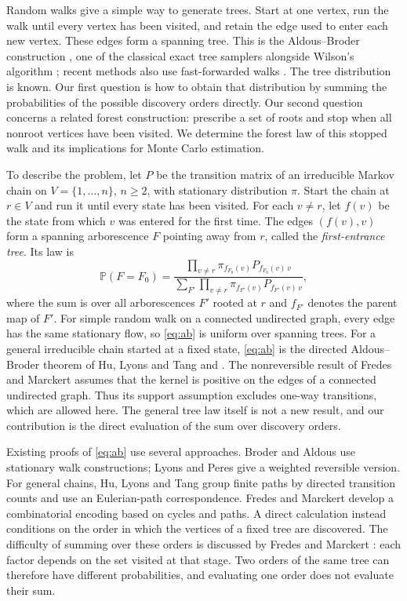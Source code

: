 \documentclass[onefignum,onetabnum,nohypdvips]{siamart250211}
\numberwithin{theorem}{section}
\numberwithin{equation}{section}
\newcommand{\pr}{\mathbb{P}}
\begin{document}
Random walks give a simple way to generate trees. Start at one vertex,
run the walk until every vertex has been visited, and retain the edge
used to enter each new vertex. These edges form a spanning tree. This
is the Aldous--Broder construction \cite{Broder1989,Aldous1990}, one of
the classical exact tree samplers alongside Wilson's algorithm
\cite{Wilson1996,ProppWilson1998}; recent methods also use
fast-forwarded walks \cite{TamDunsonDuan2025}. The tree distribution is
known. Our first question is how to obtain that distribution by
summing the probabilities of the possible discovery orders directly.
Our second question concerns a related forest construction: prescribe
a set of roots and stop when all nonroot vertices have been visited.
We determine the forest law of this stopped walk and its implications
for Monte Carlo estimation.

To describe the problem, let $P$ be the transition matrix of an
irreducible Markov chain on $V=\{1,\dots,n\}$, $n\ge2$, with stationary
distribution $\pi$. Start the chain at $r\in V$ and run it until every
state has been visited. For each $v\ne r$, let $f(v)$ be the state from
which $v$ was entered for the first time. The edges $(f(v),v)$ form a
spanning arborescence $F$ pointing away from $r$, called the
\emph{first-entrance tree}. Its law is
\begin{equation}\label{eq:ab}
\pr(F=F_0)=\frac{\prod_{v\ne r}\pi_{f_{F_0}(v)}P_{f_{F_0}(v)\,v}}
{\sum_{F'}\prod_{v\ne r}\pi_{f_{F'}(v)}P_{f_{F'}(v)\,v}},
\end{equation}
where the sum is over all arborescences $F'$ rooted at $r$ and
$f_{F'}$ denotes the parent map of $F'$. For simple random walk on a
connected undirected graph, every edge has the same stationary flow,
so \eqref{eq:ab} is uniform over spanning trees. For a general
irreducible chain started at a fixed state, \eqref{eq:ab} is the
directed Aldous--Broder theorem of Hu, Lyons and Tang
\cite[Thm.~3.4]{HuLyonsTang2021} and \cite[Thm.~3]{FredesMarckert2023}. The nonreversible result of Fredes and Marckert
\cite[Thm.~3]{FredesMarckert2023} assumes that the kernel is
positive on the edges of a connected undirected graph. Thus its
support assumption excludes one-way transitions, which are allowed
here. The general tree law itself is not a new result, and our contribution
is the direct evaluation of the sum over discovery orders.

Existing proofs of \eqref{eq:ab} use several approaches. Broder
\cite{Broder1989} and Aldous \cite{Aldous1990} use stationary walk
constructions; Lyons and Peres \cite[Cor.~4.9]{LyonsPeres2016} give a
weighted reversible version. For general chains, Hu, Lyons and Tang
\cite{HuLyonsTang2021} group finite paths by directed transition counts
and use an Eulerian-path correspondence. Fredes and Marckert
\cite{FredesMarckert2023} develop a combinatorial encoding based on
cycles and paths. A direct calculation instead conditions on the
order in which the vertices of a fixed tree are discovered. The
difficulty of summing over these orders is discussed by Fredes and
Marckert \cite[\S1 and Remark~19]{FredesMarckert2023}: each factor
depends on the set visited at that stage. Two orders of the same tree
can therefore have different probabilities, and evaluating one order
does not evaluate their sum.
\end{document}
